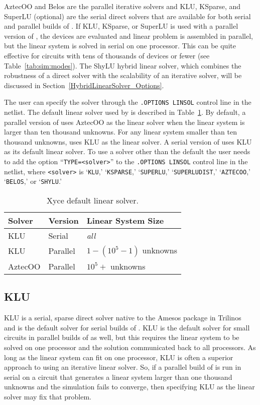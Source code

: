 AztecOO and Belos are the parallel iterative solvers and KLU, KSparse, and SuperLU (optional)
are the serial direct solvers that are available for both serial and parallel builds of \Xyce{}.  
If KLU, KSparse, or SuperLU is used with a parallel version of \Xyce{}, the devices are evaluated and
linear problem is assembled in parallel, but the linear system is solved in serial
on one processor.  This can be quite effective for circuits with tens of thousands of devices
or fewer (see Table~\ref{tab:sim:modes}). The ShyLU hybrid linear solver, which combines the robustness
of a direct solver with the scalability of an iterative solver, will be discussed in 
Section~\ref{HybridLinearSolver_Options}.  

The user can specify the solver through the \texttt{.OPTIONS LINSOL} control line 
in the netlist.  The default linear solver used by \Xyce{} is described in Table~\ref{tab:default:solver}.
By default, a parallel version of \Xyce{} uses AztecOO as the linear solver when the linear
system is larger than ten thousand unknowns.  For any linear system smaller than ten thousand unknowns,
\Xyce{} uses KLU as the linear solver.  A serial version of \Xyce{} uses KLU as its default linear 
solver.  To use a solver other than the default the user needs to add the option 
``\texttt{TYPE=<solver>}'' to the \texttt{.OPTIONS LINSOL}
control line in the netlist, where \texttt{<solver>}
is `\texttt{KLU},' `\texttt{KSPARSE},' `\texttt{SUPERLU},' `\texttt{SUPERLUDIST},' `\texttt{AZTECOO},' `\texttt{BELOS},' or `\texttt{SHYLU}.'

\begin{table}[htp]
\caption[\Xyce{} Default Linear Solver]{Xyce default linear solver.}
\label{tab:default:solver}
\begin{center}
\begin{tabular}{| p{3cm} | p{3cm} | p{4cm} |}
\hline
Solver & Version & Linear System Size\\
\hline
KLU & Serial & {\it all} \\
KLU & Parallel & $1-(10^5-1)$ unknowns \\
AztecOO & Parallel & $10^5+$ unknowns \\
\hline
\end{tabular}
\end{center}
\end{table}

\subsection{KLU}
KLU is a serial, sparse direct solver native to the Amesos package in Trilinos~\cite{trilinos:toms} and is the default solver for serial builds of \Xyce{}. 
KLU is the default solver for small circuits in parallel builds of \Xyce{} as well, but this requires the linear system to be solved 
on one processor and the solution communicated back to all processors. As long as the linear system can fit on one processor, KLU is 
often a superior approach to using an iterative linear solver.  So, if a parallel build of \Xyce{} is run in serial on a circuit that generates a linear system
larger than one thousand unknowns and the simulation fails to converge, then specifying KLU as the linear solver may fix that problem.  

